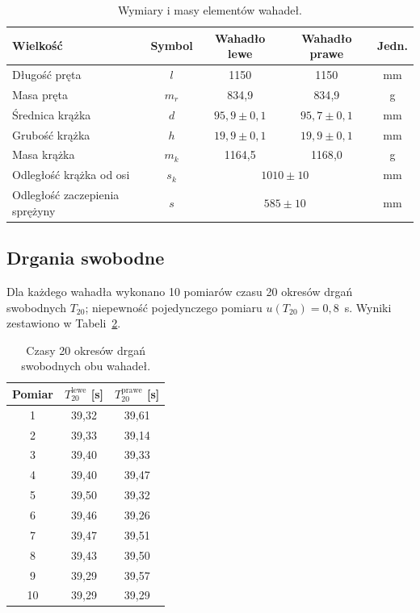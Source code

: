 \documentclass[12pt, a4paper]{article}
\begin{document}
\begin{table}[H]
    \centering
    \caption{Wymiary i masy elementów wahadeł.}\label{tab:wymiary}
    \begin{tabular}{lcccc}
        \toprule
        Wielkość & Symbol & Wahadło lewe & Wahadło prawe & Jedn. \\
        \midrule
        Długość pręta           & $l$     & 1150      & 1150      & mm \\
        Masa pręta              & $m_r$   & 834{,}9   & 834{,}9   & g  \\
        Średnica krążka         & $d$     & $95{,}9 \pm 0{,}1$ & $95{,}7 \pm 0{,}1$ & mm \\
        Grubość krążka          & $h$     & $19{,}9 \pm 0{,}1$ & $19{,}9 \pm 0{,}1$ & mm \\
        Masa krążka             & $m_k$   & 1164{,}5  & 1168{,}0  & g  \\
        Odległość krążka od osi & $s_k$   & \multicolumn{2}{c}{$1010 \pm 10$} & mm \\
        Odległość zaczepienia sprężyny & $s$ & \multicolumn{2}{c}{$585 \pm 10$} & mm \\
        \bottomrule
    \end{tabular}
\end{table}

\subsection{Drgania swobodne}

Dla każdego wahadła wykonano 10 pomiarów czasu 20 okresów drgań swobodnych $T_{20}$;
niepewność pojedynczego pomiaru $u(T_{20}) = 0{,}8$~s.
Wyniki zestawiono w Tabeli~\ref{tab:drgania_swobodne}.

\begin{table}[H]
    \centering
    \caption{Czasy 20 okresów drgań swobodnych obu wahadeł.}\label{tab:drgania_swobodne}
    \begin{tabular}{ccc}
        \toprule
        Pomiar & $T_{20}^\text{lewe}$ [s] & $T_{20}^\text{prawe}$ [s] \\
        \midrule
        1  & 39{,}32 & 39{,}61 \\
        2  & 39{,}33 & 39{,}14 \\
        3  & 39{,}40 & 39{,}33 \\
        4  & 39{,}40 & 39{,}47 \\
        5  & 39{,}50 & 39{,}32 \\
        6  & 39{,}46 & 39{,}26 \\
        7  & 39{,}47 & 39{,}51 \\
        8  & 39{,}43 & 39{,}50 \\
        9  & 39{,}29 & 39{,}57 \\
        10 & 39{,}29 & 39{,}29 \\
        \bottomrule
    \end{tabular}
\end{table}
\end{document}
